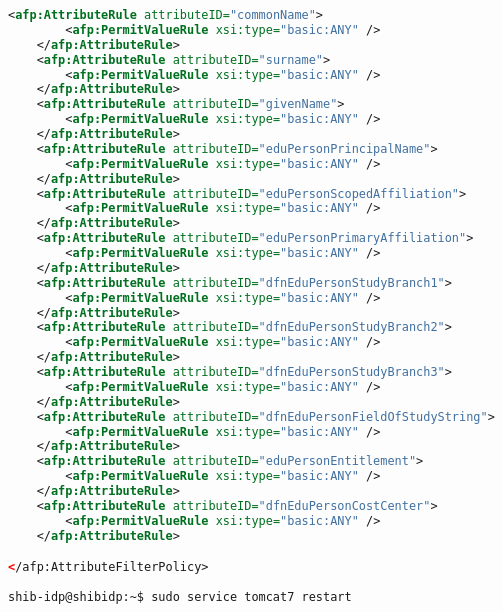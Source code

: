 \begin{lstlisting}[language=xml]
	<afp:AttributeRule attributeID="commonName">
		<afp:PermitValueRule xsi:type="basic:ANY" />
	</afp:AttributeRule>
	<afp:AttributeRule attributeID="surname">
		<afp:PermitValueRule xsi:type="basic:ANY" />
	</afp:AttributeRule>
	<afp:AttributeRule attributeID="givenName">
		<afp:PermitValueRule xsi:type="basic:ANY" />
	</afp:AttributeRule>
	<afp:AttributeRule attributeID="eduPersonPrincipalName">
		<afp:PermitValueRule xsi:type="basic:ANY" />
	</afp:AttributeRule>
	<afp:AttributeRule attributeID="eduPersonScopedAffiliation">
		<afp:PermitValueRule xsi:type="basic:ANY" />
	</afp:AttributeRule>
	<afp:AttributeRule attributeID="eduPersonPrimaryAffiliation">
		<afp:PermitValueRule xsi:type="basic:ANY" />
	</afp:AttributeRule>
	<afp:AttributeRule attributeID="dfnEduPersonStudyBranch1">
		<afp:PermitValueRule xsi:type="basic:ANY" />
	</afp:AttributeRule>
	<afp:AttributeRule attributeID="dfnEduPersonStudyBranch2">
		<afp:PermitValueRule xsi:type="basic:ANY" />
	</afp:AttributeRule>
	<afp:AttributeRule attributeID="dfnEduPersonStudyBranch3">
		<afp:PermitValueRule xsi:type="basic:ANY" />
	</afp:AttributeRule>
	<afp:AttributeRule attributeID="dfnEduPersonFieldOfStudyString">
		<afp:PermitValueRule xsi:type="basic:ANY" />
	</afp:AttributeRule>
	<afp:AttributeRule attributeID="eduPersonEntitlement">
		<afp:PermitValueRule xsi:type="basic:ANY" />
	</afp:AttributeRule>
	<afp:AttributeRule attributeID="dfnEduPersonCostCenter">
		<afp:PermitValueRule xsi:type="basic:ANY" />
	</afp:AttributeRule>

</afp:AttributeFilterPolicy>
\end{lstlisting}		
\begin{lstlisting}
shib-idp@shibidp:~$ sudo service tomcat7 restart
\end{lstlisting}
